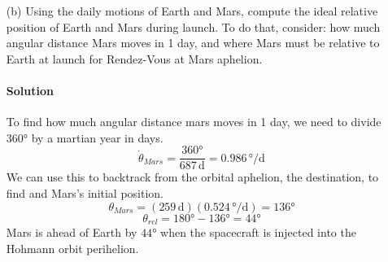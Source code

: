 \documentclass{article}
\begin{document}
{\begin{enumerate}
		\paragraph{Solution} The Hohmann trajectory is the half ellipse formed where the perihelion is at the orbit of the initial body, and the aphelion is at the orbit of the destination body. The semi-major axis of the elliptical orbit can be used with Kepler's Third Law to find the transfer time. \\ \unboldmath
		
		The semi-major axis is half the distance from the perihelion to the aphelion. and that distance is the sum of the distances from the Sun to Earth and the Sun to Mars.
		\[
			a = \frac{r_E + r_{Mars}}{2}
		\]
		\[
			a = \frac{(\num{1.5e11} \, \unit{\meter}) + (\num{2.28e11} \, \unit{\meter})}{2} = (\num{1.89e11} \, \unit{\meter})
		\]
		\[
			T^2 = \frac{4\pi^2}{GM_{\bigodot}} a^3
		\]
		The elliptical orbit has the sun at one focus, and the ellipse itself is formed by the gravitational pull of the Sun.
		\[
			T = \sqrt{\frac{4\pi^2 (\num{1.89e11} \, \unit{\meter})^3}{(\num{6.6743e-11} \, \unit{\newton\meter\squared\per\kilogram\squared})(\num{2e30} \, \unit{\kilogram})}} = \num{4.47e7} \, \unit{\second}
		\]
		Since the Hohmann trajectory is only half of the elliptical orbit, we can take half of the orbital period to find the transfer time.
		\[
			t = \frac{\num{4.47e7} \, \unit{\second}}{2} = \num{2.235e7} \, \unit{\second} \left( \frac{\num{1} \, \unit{\minute}}{\num{60} \, \unit{\second}} \frac{\num{1} \, \unit{\hour}}{\num{60} \, \unit{\minute}} \frac{\num{1} \, \unit{\day}}{\num{24} \, \unit{\hour}} \right) \approx \num{259} \, \unit{\day}
		\]
		
		\boldmath
		\item[(b)] Using the daily motions of Earth and Mars, compute the ideal relative position of Earth and Mars during launch. To do that, consider: how much angular distance Mars moves in 1 day, and where Mars must be relative to Earth at launch for Rendez-Vous at Mars aphelion. 
		\paragraph{Solution} To find how much angular distance mars moves in 1 day, we need to divide $\ang{360}$ by a martian year in days. \\ \unboldmath
		\[
			\dot{\theta}_{Mars} = \frac{\ang{360}}{\num{687} \, \unit{\day}} = \num{0.986} \, \unit{\degree\per\day}
		\]
		We can use this to backtrack from the orbital aphelion, the destination, to find and Mars's initial position.
		\[
			\theta_{Mars} = (\num{259} \, \unit{\day})(\num{0.524} \, \unit{\degree\per\day}) = \ang{136}
		\]
		\[
			\theta_{rel} = \ang{180} - \ang{136} = \ang{44}
		\]
		Mars is ahead of Earth by $\ang{44}$ when the spacecraft is injected into the Hohmann orbit perihelion.
		

\end{enumerate}}
\end{document}
